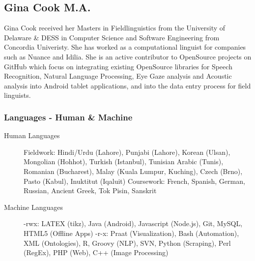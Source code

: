 \documentclass[12 pt]{article}
\begin{document}
\subsection{Gina Cook M.A.}

Gina Cook received her Masters in Fieldlinguistics from the University of Delaware \& DESS in Computer Science and Software Engineering from Concordia Univeristy. She has worked as a computational linguist for companies such as Nuance and Idilia.  She is an active contributor to OpenSource projects on GitHub which focus on integrating existing OpenSource libraries for Speech Recognition, Natural Language Processing, Eye Gaze analysis and Acoustic analysis into Android tablet applications, and into the data entry process for field linguists.



\subsubsection{Languages - Human \& Machine}
\begin{description}
\item [
Human Languages] Fieldwork: Hindi/Urdu (Lahore), Punjabi (Lahore), Korean (Ulsan), Mongolian (Hohhot), Turkish (Istanbul), Tunisian Arabic (Tunis), Romanian (Bucharest), Malay (Kuala Lumpur, Kuching), Czech (Brno), Pasto (Kabul), Inuktitut (Iqaluit) Coursework: French, Spanish, German, Russian, Ancient Greek, Tok Pisin, Sanskrit
\item [
Machine Languages] -rwx: LATEX (tikz), Java (Android), Javascript (Node.js), Git, MySQL, HTML5 (Offline Apps) -r-x: Praat (Visualization), Bash (Automation), XML (Ontologies), R, Groovy (NLP), SVN, Python (Scraping), Perl (RegEx), PHP (Web), C++ (Image Processing)

\end{description}
\end{document}
